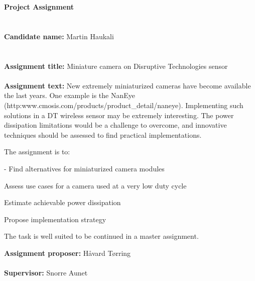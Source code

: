 \newpage

\Huge{\textbf{Project Assignment}}
\\
\\
\\
\small
\textbf{Candidate name: }  Martin Haukali
\\
\\
\\
\textbf{Assignment title:} Miniature camera on Disruptive Technologies sensor
\\
\\
\textbf{ Assignment text: }
New extremely miniaturized cameras have become available the last years. One example is the NanEye (http:\/\/www.cmosis.com/products/product\_detail/naneye). Implementing such solutions in a DT wireless sensor may be extremely interesting. The power dissipation limitations would be a challenge to overcome, and innovative techniques should be assessed to find practical implementations.



The assignment is to:

- Find alternatives for miniaturized camera modules


Assess use cases for a camera used at a very low duty cycle


Estimate achievable power dissipation


Propose implementation strategy


The task is well suited to be continued in a master assignment.


\textbf{Assignment proposer: } Håvard Tørring
\\
\\
\textbf{Supervisor: }Snorre Aunet